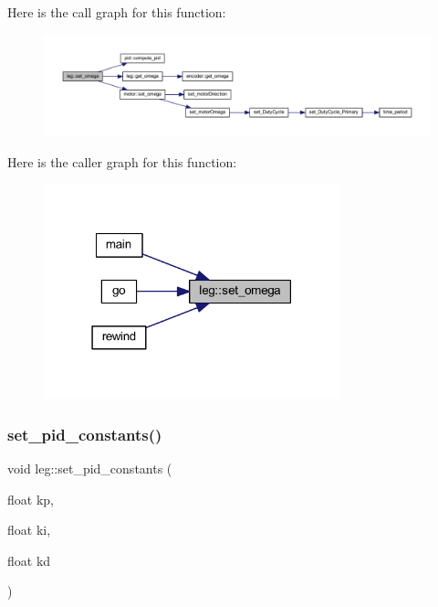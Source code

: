Here is the call graph for this function\+:
\nopagebreak
\begin{figure}[H]
\begin{center}
\leavevmode
\includegraphics[width=350pt]{classleg_a0b0845622d8b17f34739b390846bf957_cgraph}
\end{center}
\end{figure}
Here is the caller graph for this function\+:
\nopagebreak
\begin{figure}[H]
\begin{center}
\leavevmode
\includegraphics[width=243pt]{classleg_a0b0845622d8b17f34739b390846bf957_icgraph}
\end{center}
\end{figure}
\mbox{\label{classleg_af28c31cfef29472bc1392af5ad48b97b}} 
\subsubsection{\texorpdfstring{set\_pid\_constants()}{set\_pid\_constants()}}
{\footnotesize\ttfamily void leg\+::set\+\_\+pid\+\_\+constants (\begin{DoxyParamCaption}\item[{float}]{kp,  }\item[{float}]{ki,  }\item[{float}]{kd }\end{DoxyParamCaption})\hspace{0.3cm}{\ttfamily [inline]}}



